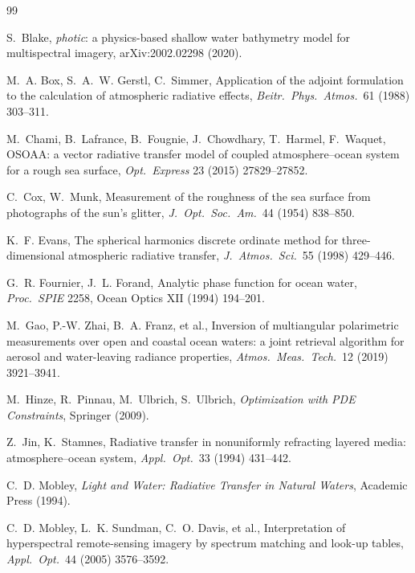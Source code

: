 \documentclass[11pt]{article}
\numberwithin{equation}{section}
\begin{document}
\begin{thebibliography}{99}

 S.~Blake, \textit{photic}: a physics-based shallow water bathymetry model
for multispectral imagery, arXiv:2002.02298 (2020).

 M.~A. Box, S.~A.~W. Gerstl, C.~Simmer, Application of the adjoint
formulation to the calculation of atmospheric radiative effects, \textit{Beitr.\ Phys.\
Atmos.}\ 61 (1988) 303--311.

 M.~Chami, B.~Lafrance, B.~Fougnie, J.~Chowdhary, T.~Harmel, F.~Waquet,
OSOAA: a vector radiative transfer model of coupled atmosphere--ocean system for a rough sea
surface, \textit{Opt.\ Express} 23 (2015) 27829--27852.

 C.~Cox, W.~Munk, Measurement of the roughness of the sea surface from
photographs of the sun's glitter, \textit{J.\ Opt.\ Soc.\ Am.}\ 44 (1954) 838--850.

 K.~F. Evans, The spherical harmonics discrete ordinate method for
three-dimensional atmospheric radiative transfer, \textit{J.\ Atmos.\ Sci.}\ 55 (1998)
429--446.

 G.~R. Fournier, J.~L. Forand, Analytic phase function for ocean water,
\textit{Proc.\ SPIE} 2258, Ocean Optics XII (1994) 194--201.

 M.~Gao, P.-W. Zhai, B.~A. Franz, et al., Inversion of multiangular
polarimetric measurements over open and coastal ocean waters: a joint retrieval algorithm for
aerosol and water-leaving radiance properties, \textit{Atmos.\ Meas.\ Tech.}\ 12 (2019)
3921--3941.

 M.~Hinze, R.~Pinnau, M.~Ulbrich, S.~Ulbrich, \textit{Optimization with PDE
Constraints}, Springer (2009).

 Z.~Jin, K.~Stamnes, Radiative transfer in nonuniformly refracting layered
media: atmosphere--ocean system, \textit{Appl.\ Opt.}\ 33 (1994) 431--442.

 C.~D. Mobley, \textit{Light and Water: Radiative Transfer in Natural
Waters}, Academic Press (1994).

 C.~D. Mobley, L.~K. Sundman, C.~O. Davis, et al., Interpretation of
hyperspectral remote-sensing imagery by spectrum matching and look-up tables, \textit{Appl.\
Opt.}\ 44 (2005) 3576--3592.


\end{thebibliography}
\end{document}
